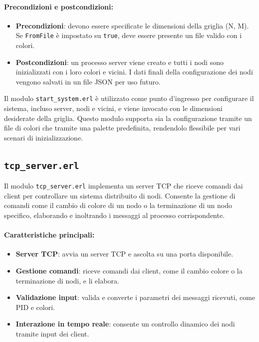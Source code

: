 \documentclass[12pt, a4paper]{report}
\begin{document}
\paragraph{Precondizioni e postcondizioni:}
\begin{itemize}
    \item \textbf{Precondizioni}: devono essere specificate le dimensioni della griglia (N, M). Se \texttt{FromFile} è impostato su \texttt{true}, deve essere presente un file valido con i colori.
    \item \textbf{Postcondizioni}: un processo server viene creato e tutti i nodi sono inizializzati con i loro colori e vicini. I dati finali della configurazione dei nodi vengono salvati in un file JSON per uso futuro.
\end{itemize}

\noindent
Il modulo \texttt{start\_system.erl} è utilizzato come punto d'ingresso per configurare il sistema, incluso server, nodi e vicini, e viene invocato con le dimensioni desiderate della griglia. Questo modulo supporta sia la configurazione tramite un file di colori che tramite una palette predefinita, rendendolo flessibile per vari scenari di inizializzazione.

\subsection{\texttt{tcp\_server.erl}}

Il modulo \texttt{tcp\_server.erl} implementa un server TCP che riceve comandi dai client per controllare un sistema distribuito di nodi. Consente la gestione di comandi come il cambio di colore di un nodo o la terminazione di un nodo specifico, elaborando e inoltrando i messaggi al processo corrispondente.

\paragraph{Caratteristiche principali:}
\begin{itemize}
    \item \textbf{Server TCP}: avvia un server TCP e ascolta su una porta disponibile.
    \item \textbf{Gestione comandi}: riceve comandi dai client, come il cambio colore o la terminazione di nodi, e li elabora.
    \item \textbf{Validazione input}: valida e converte i parametri dei messaggi ricevuti, come PID e colori.
    \item \textbf{Interazione in tempo reale}: consente un controllo dinamico dei nodi tramite input dei client.
\end{itemize}
\end{document}
